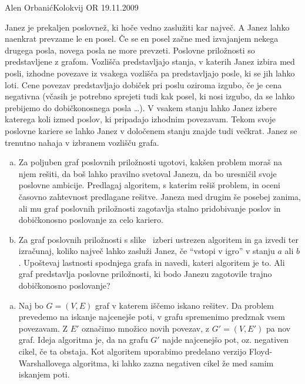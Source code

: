 \begin{naloga}{Alen Orbanić}{Kolokvij OR 19.11.2009}
\begin{vprasanje}
Janez je prekaljen poslovnež, ki hoče vedno zaslužiti kar največ.
A Janez lahko naenkrat prevzame le en posel.
Če se en posel začne med izvajanjem nekega drugega posla,
novega posla ne more prevzeti.
Poslovne priložnosti so predstavljene z grafom.
Vozlišča predstavljajo stanja, v katerih Janez izbira med posli,
izhodne povezave iz vsakega vozlišča pa predstavljajo posle,
ki se jih lahko loti.
Cene povezav predstavljajo dobiček pri poslu oziroma izgubo,
če je cena negativna
(včasih je potrebno sprejeti tudi kak posel, ki nosi izgubo,
da se lahko prebijemo do dobičkonosnega posla \dots).
V vsakem stanju lahko Janez izbere katerega koli izmed poslov,
ki pripadajo izhodnim povezavam.
Tekom svoje poslovne kariere se lahko Janez
v določenem stanju znajde tudi večkrat.
Janez se trenutno nahaja v izbranem vozlišču grafa.
\begin{enumerate}[(a)]
\item Za poljuben graf poslovnih priložnosti ugotovi,
kakšen problem moraš na njem rešiti, da boš lahko pravilno svetoval Janezu,
da bo uresničil svoje poslovne ambicije.
Predlagaj algoritem, s katerim rešiš problem,
in oceni časovno zahtevnost predlagane rešitve.
Janeza med drugim še posebej zanima,
ali mu graf poslovnih priložnosti zagotavlja stalno pridobivanje poslov
in dobičkonosno poslovanje za celo kariero.
\item Za graf poslovnih priložnosti s slike~\fig
izberi ustrezen algoritem in ga izvedi ter izračunaj,
koliko največ lahko zasluži Janez, če ``vstopi v igro'' v stanju $a$ ali $b$.
Upoštevaj lastnosti spodnjega grafa in navedi, kateri algoritem je to.
Ali graf predstavlja poslovne priložnosti,
ki bodo Janezu zagotovile trajno dobičkonosno poslovanje?
\end{enumerate}

\begin{slika}
\pgfslika
{}
\end{slika}
\end{vprasanje}
\begin{odgovor}
\begin{enumerate}[(a)]
\item Naj bo $G=(V,E)$ graf v katerem iščemo iskano rešitev. Da problem prevedemo na 
iskanje najcenejše poti, v grafu spremenimo predznak vsem povezavam. Z $E'$ označimo
množico novih povezav, z $G'=(V,E')$ pa nov graf. Ideja algoritma je, da na grafu $G'$
najde najcenejšo pot, oz. negativen cikel, če ta obstaja. Kot algoritem uporabimo 
predelano verzijo Floyd-Warshallovega algoritma, ki lahko zazna negativen cikel že med 
samim iskanjem poti. 


\end{enumerate}
\end{odgovor}
\end{naloga}
